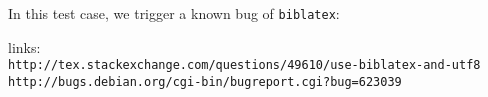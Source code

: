 \documentclass{article}
\begin{document}
\noindent In this test case, we trigger a known bug of \verb+biblatex+:

\noindent links:\\
\verb+http://tex.stackexchange.com/questions/49610/use-biblatex-and-utf8+\\
\verb+http://bugs.debian.org/cgi-bin/bugreport.cgi?bug=623039+

\printbibliography
\end{document}
